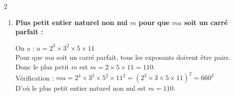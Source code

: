 \documentclass[10pt, a4paper]{article}
\begin{document}
\begin{multicols*}{2}
\begin{Solution}[APPLICATION][12]
\begin{enumerate}[leftmargin=*,itemsep=0.5pt]
    Donc :
    \begin{align*}
        \sqrt{ab} &= \sqrt{2^5 \times 3^3 \times 5^3 \times 7 \times 11} \\
                  &= \sqrt{(2^4 \times 3^2 \times 5^2) \times (2 \times 3 \times 5 \times 7 \times 11)} \\
                  &= 2^2 \times 3 \times 5 \times \sqrt{2 \times 3 \times 5 \times 7 \times 11} \\
                  &= 60\sqrt{2310}
    \end{align*}

    \item \textbf{Plus petit entier naturel non nul $m$ pour que $ma$ soit un carré parfait :}

    On a : \quad $a = 2^3 \times 3^2 \times 5 \times 11$ \\
    Pour que $ma$ soit un carré parfait, tous les exposants doivent être pairs. \\
    Donc le plus petit $m$ est $m = 2 \times 5 \times 11 = 110$. \\
    Vérification : $ma = 2^4 \times 3^2 \times 5^2 \times 11^2 = (2^2 \times 3 \times 5 \times 11)^2 = 660^2$\\
    D'où le plus petit entier naturel non nul est $m = 110$.
\end{enumerate}
\end{Solution}


\end{multicols*}
\end{document}
